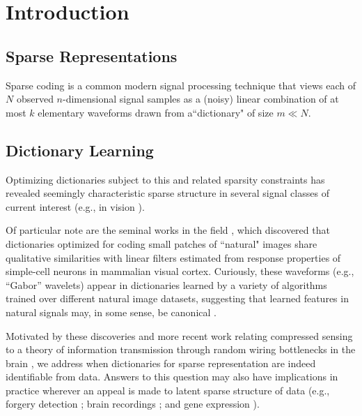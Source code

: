 \chapter{Introduction}\label{Intro}

\section{Sparse Representations}

Sparse coding is a common modern signal processing technique that views each of $N$ observed $n$-dimensional signal samples as a (noisy) linear combination of at most $k$ elementary waveforms drawn from a``dictionary" of size $m \ll N$. %

\section{Dictionary Learning}

Optimizing dictionaries subject to this and related sparsity constraints has revealed seemingly characteristic sparse structure in several signal classes of current interest (e.g., in vision \cite{wang2015sparse}). 

Of particular note are the seminal works in the field \cite{Olshausen96, hurri1996image, bell1997independent, van1998independent}, which discovered that dictionaries optimized for coding small patches of ``natural" images share qualitative similarities with linear filters estimated from response properties of simple-cell neurons in mammalian visual cortex. Curiously, these waveforms (e.g., ``Gabor'' wavelets) appear in dictionaries learned by a variety of algorithms trained over different natural image datasets, suggesting that learned features in natural signals may, in some sense, be canonical \cite{donoho2001can}.

Motivated by these discoveries and more recent work relating compressed sensing \cite{eldar2012compressed} to a theory of information transmission through random wiring bottlenecks in the brain \cite{Isely10}, we address when dictionaries for sparse representation are indeed identifiable from data. Answers to this question may also have implications in practice wherever an appeal is made to latent sparse structure of data (e.g., forgery detection \cite{hughes2010, olshausen2010applied}; brain recordings \cite{jung2001imaging, agarwal2014spatially, lee2016sparse}; and gene expression \cite{wu2016stability}). 

